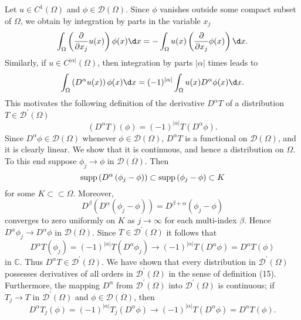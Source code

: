 \begin{para}

  Let $u \in C^1(\Omega)$ and $\phi \in \mathscr{D}(\Omega)$. Since $\phi$ vanishes outside some compact subset of $\Omega$, we obtain by integration by parts in the variable $x_j$
  \[
  \int_{\Omega}\left(\frac{\partial}{\partial x_j} u(x)\right) \phi(x) \d x
    = -\int_{\Omega} u(x)\left(\frac{\partial}{\partial x_j} \phi(x)\right) \d x.
  \]
  Similarly, if $u \in C^{|\alpha|}(\Omega)$, then integration by parts $|\alpha|$ times leads to
  \[
  \int_{\Omega}\left(D^\alpha u(x)\right) \phi(x) \d x
    =(-1)^{|\alpha|} \int_{\Omega} u(x) D^\alpha \phi(x) \d x.
  \]
  This motivates the following definition of the derivative $D^\alpha T$
  of a distribution $T \in \mathscr{D}^{\prime}(\Omega)$
  \[
  \left(D^\alpha T\right)(\phi)=(-1)^{|\alpha|} T\left(D^\alpha \phi\right) .
  \]
  Since $D^\alpha \phi \in \mathscr{D}(\Omega)$ whenever $\phi \in \mathscr{D}(\Omega)$,
  $D^\alpha T$ is a functional on $\mathscr{D}(\Omega)$, and it is clearly linear.
  We show that it is continuous, and hence a distribution on $\Omega$.
  To this end suppose $\phi_j \rightarrow \phi$ in $\mathscr{D}(\Omega)$. Then
  \[
    \operatorname{supp}\left(D^\alpha\left(\phi_j-\phi\right)\right) \subset \operatorname{supp}\left(\phi_j-\phi\right) \subset K
  \]
  for some $K \subset\subset \Omega$. Moreover,
  \[
  D^\beta\left(D^\alpha\left(\phi_j-\phi\right)\right)=D^{\beta+\alpha}\left(\phi_j-\phi\right)
  \]
  converges to zero uniformly on $K$ as $j \rightarrow \infty$ for each multi-index $\beta$.
  Hence $D^\alpha \phi_j \rightarrow D^\alpha \phi$ in $\mathscr{D}(\Omega)$.
  Since $T \in \mathscr{D}^{\prime}(\Omega)$ it follows that
  \[
  D^\alpha T\left(\phi_j\right)=(-1)^{|\alpha|} T\left(D^\alpha \phi_j\right) \rightarrow(-1)^{|\alpha|} T\left(D^\alpha \phi\right)=D^\alpha T(\phi)
  \]
  in $\mathbb{C}$. Thus $D^\alpha T \in \mathscr{D}^{\prime}(\Omega)$.
  We have shown that every distribution in $\mathscr{D}^{\prime}(\Omega)$ possesses derivatives
  of all orders in $\mathscr{D}^{\prime}(\Omega)$ in the sense of definition (15).
  Furthermore, the mapping $D^\alpha$ from $\mathscr{D}^{\prime}(\Omega)$
  into $\mathscr{D}^{\prime}(\Omega)$ is continuous;
  if $T_j \rightarrow T$ in $\mathscr{D}^{\prime}(\Omega)$ and $\phi \in \mathscr{D}(\Omega)$,
  then
  \[
  D^\alpha T_j(\phi)=(-1)^{|\alpha|} T_j\left(D^\alpha \phi\right) \rightarrow(-1)^{|\alpha|} T\left(D^\alpha \phi\right)=D^\alpha T(\phi) .
  \]
\end{para}

